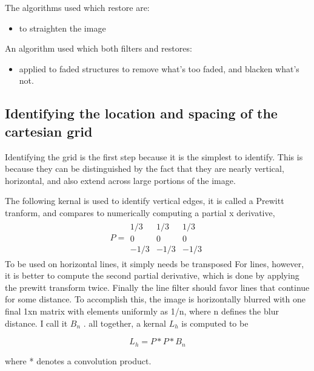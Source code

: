 \documentclass{article}
\begin{document}
    The algorithms used which restore are:
    \begin{itemize}
        \item[shifting] to straighten the image                     
    \end{itemize}
    An algorithm used which both filters and restores: 
    \begin{itemize}
        \item[Threshold] applied to faded structures to remove what's too faded, and blacken what's not.
    \end{itemize}
        

    \subsection{Identifying the location and spacing of the cartesian grid}
        Identifying the grid is the first step because it is the simplest to identify.
        This is because they can be  distinguished by the fact that they are nearly vertical, horizontal, and 
        also extend across large portions of the image.

        The following kernal is used to identify vertical edges, it is called a Prewitt tranform,
        and compares to numerically computing a partial x derivative,
        \begin{gather}
            P = 
            \begin{matrix}
                1/3 & 1/3 & 1/3\\
                0 & 0 & 0\\
                -1/3 & -1/3 & -1/3
            \end{matrix}
        \end{gather}
        To be used on horizontal lines, it simply needs be transposed  
        For lines, however, it is better to compute the second partial derivative, 
        which is done by applying the prewitt transform twice. Finally the line filter should favor lines that continue for some distance.
        To accomplish this, the image is horizontally blurred with one final 1xn matrix with elements uniformly as 1/n, 
        where n defines the blur distance. I call it $B_n$ . all together, a kernal $L_h$ is computed to be

        \begin{equation}
            L_h= P \ast P \ast B_n
        \end{equation}

        where * denotes a convolution product.
\end{document}
